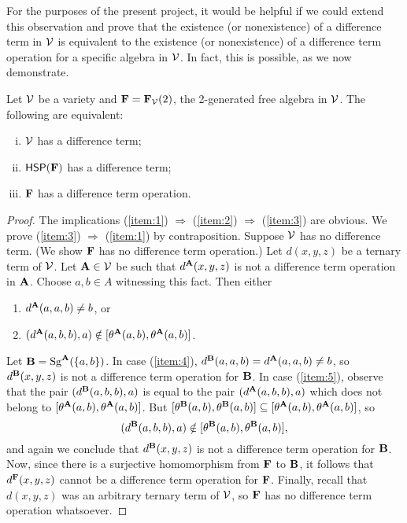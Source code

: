 For the purposes of the present project,
it would be helpful if we could extend this observation and
prove that the existence (or nonexistence) of a difference term in $\mathcal{V}$
is equivalent to the  existence (or nonexistence) of a difference term
operation for a specific algebra in $\mathcal{V}$.  In fact, this is possible, as we
now demonstrate.

\begin{thm}
  \label{thm:F}
Let $\mathcal{V}$ be a variety and $\mathbf{F} = \mathbf{F}_{\mathcal{V}}(2)$, the 2-generated
free algebra in $\mathcal{V}$. The following are equivalent:
\begin{enumerate}[(i)]
\item \label{item:1}
  $\mathcal{V}$ has a difference term;
\item \label{item:2}
  $\mathsf{H} \mathsf{S} \mathsf{P} (\mathbf{F})$ has a difference term;
\item \label{item:3}
  $\mathbf{F}$ has a difference term operation.
\end{enumerate}
\end{thm}
\begin{proof}
  The implications
  (\ref{item:1}) $\Rightarrow$  (\ref{item:2}) $\Rightarrow$  (\ref{item:3}) are
  obvious. We prove
  (\ref{item:3}) $\Rightarrow$  (\ref{item:1}) by contraposition.
  Suppose $\mathcal{V}$ has no difference term. (We show $\mathbf{F}$ has no difference term
  operation.)
  Let $d(x,y,z)$ be a ternary term of $\mathcal{V}$.  Let $\mathbf{A}\in \mathcal{V}$ be such that
  $d^{\mathbf{A}}(x,y,z)$ is not a difference term operation in $\mathbf{A}$.
  Choose $a, b \in A$ witnessing this fact.  Then either
  \begin{enumerate}
  \item\label{item:4} $d^{\mathbf{A}}(a,a,b) \neq b$, or
  \item\label{item:5} $(d^{\mathbf{A}}(a,b,b), a) \notin [\theta^{\mathbf{A}} (a, b), \theta^{\mathbf{A}} (a,b)]$.
  \end{enumerate}
  Let $\mathbf{B} = \operatorname{Sg}^{\mathbf{A}} (\{a, b\})$.  In case
  (\ref{item:4}), 
  $d^{\mathbf{B}}(a,a,b) = d^{\mathbf{A}}(a,a,b) \neq b$, so $d^{\mathbf{B}}(x,y,z)$ is not a difference
  term operation for $\mathbf{B}$.
  In case (\ref{item:5}), observe that
  the pair $(d^{\mathbf{B}}(a,b,b), a)$ is equal to the pair $(d^{\mathbf{A}}(a,b,b), a)$ which
  does not belong to $[\theta^{\mathbf{A}} (a, b), \theta^{\mathbf{A}} (a,b)]$.
  But 
  $[\theta^{\mathbf{B}} (a, b), \theta^{\mathbf{B}} (a,b)] \subseteq[\theta^{\mathbf{A}} (a, b), \theta^{\mathbf{A}} (a,b)]$, so
  \[(d^{\mathbf{B}}(a,b,b), a) \notin [\theta^{\mathbf{B}} (a, b), \theta^{\mathbf{B}} (a,b)],\]
  and again we conclude that $d^{\mathbf{B}}(x,y,z)$ is not a difference term operation for $\mathbf{B}$.
  Now, since there is a surjective homomorphism from $\mathbf{F}$ to $\mathbf{B}$,
  it follows that $d^{\mathbf{F}}(x,y,z)$ cannot be a difference term operation for $\mathbf{F}$.
  Finally, recall that $d(x,y,z)$ was an arbitrary ternary term of $\mathcal{V}$, so
  $\mathbf{F}$ has no difference term operation whatsoever.
\end{proof}



